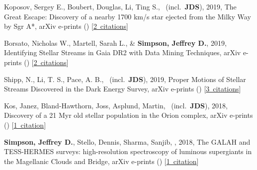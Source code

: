 \item[{\color{numcolor}\scriptsize5}] Koposov, Sergey E., Boubert, Douglas, Li, Ting S., \etal\ (incl.\ \textbf{JDS}), 2019, The Great Escape: Discovery of a nearby 1700 km/s star ejected from the Milky Way by Sgr A*, arXiv e-prints () [\href{https://ui.adsabs.harvard.edu/#abs/2019arXiv190711725K}{2~citations}]

\item[{\color{numcolor}\scriptsize4}] Borsato, Nicholas W., Martell, Sarah L., \& \textbf{Simpson, Jeffrey D.}, 2019, Identifying Stellar Streams in Gaia DR2 with Data Mining Techniques, arXiv e-prints () [\href{https://ui.adsabs.harvard.edu/#abs/2019arXiv190702527B}{2~citations}]

\item[{\color{numcolor}\scriptsize3}] Shipp, N., Li, T. S., Pace, A. B., \etal\ (incl.\ \textbf{JDS}), 2019, Proper Motions of Stellar Streams Discovered in the Dark Energy Survey, arXiv e-prints () [\href{https://ui.adsabs.harvard.edu/#abs/2019arXiv190709488S}{3~citations}]

\item[{\color{numcolor}\scriptsize2}] Kos, Janez, Bland-Hawthorn, Joss, Asplund, Martin, \etal\ (incl.\ \textbf{JDS}), 2018, Discovery of a 21 Myr old stellar population in the Orion complex, arXiv e-prints () [\href{https://ui.adsabs.harvard.edu/#abs/2018arXiv181111762K}{1~citation}]

\item[{\color{numcolor}\scriptsize1}] \textbf{Simpson, Jeffrey D.}, Stello, Dennis, Sharma, Sanjib, \etal, 2018, The GALAH and TESS-HERMES surveys: high-resolution spectroscopy of luminous supergiants in the Magellanic Clouds and Bridge, arXiv e-prints () [\href{https://ui.adsabs.harvard.edu/#abs/2018arXiv180405900S}{1~citation}]